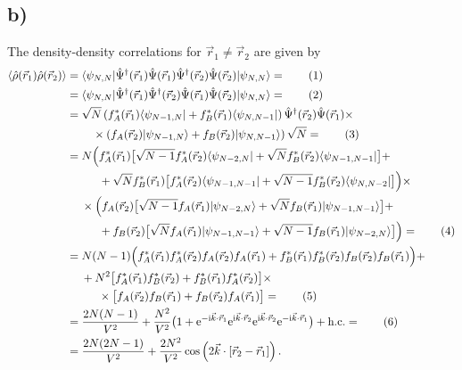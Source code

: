 \documentclass[english, parskip=full]{scrartcl}
\newcommand\numberthis{\addtocounter{equation}{1}\tag{\theequation}}
\newcommand{\bra}{}
\newcommand{\braket}{}
\newcommand{\kla}{}
\newcommand{\tecxt}{}
\newcommand{\Bra}{}
\newcommand{\Ket}{}
\renewcommand{\i}{\text{i}}
\newcommand{\e}{\text{e}}
\begin{document}
\subsection*{b)}
The density-density correlations for $\vec{r}_1 \neq \vec{r}_2$ are given by
\begin{align*}
\bra\langle \hat{\rho}(\vec{r}_1) \hat{\rho}(\vec{r}_2) \rangle &= \braket\langle \psi_{N,N} | \hat{\Psi}^\dagger (\vec{r}_1) \hat{\Psi}(\vec{r}_1) \hat{\Psi}^\dagger (\vec{r}_2) \hat{\Psi}(\vec{r}_2) | \psi_{N,N} \rangle = \numberthis  \\
&= \braket\langle \psi_{N,N} | \hat{\Psi}^\dagger (\vec{r}_1) \hat{\Psi}^\dagger (\vec{r}_2) \hat{\Psi}(\vec{r}_1) \hat{\Psi}(\vec{r}_2) | \psi_{N,N} \rangle = \numberthis \\
&= \sqrt{N}\kla\left( f_A^\ast (\vec{r}_1) \Bra\langle \psi_{N-1,N} | + f_B^\ast (\vec{r}_1) \Bra\langle \psi_{N,N-1} | \right) \hat{\Psi}^\dagger (\vec{r}_2) \hat{\Psi}(\vec{r}_1) \times \\
&\hspace{0.8cm} \times \kla\left( f_A (\vec{r}_2) | \psi_{N-1,N} \rangle  + f_B (\vec{r}_2) | \psi_{N,N-1} \rangle  \right) \sqrt{N} =  \numberthis \\
&= N \Big( f_A^\ast (\vec{r}_1) \big[ \sqrt{N-1} f_A^\ast (\vec{r}_2) \Bra\langle \psi_{N-2,N} | + \sqrt{N} f_B^\ast (\vec{r}_2) \Bra\langle \psi_{N-1,N-1} | \big] + \\
&\hspace{1cm} + \sqrt{N} f_B^\ast (\vec{r}_1) \big[ f_A^\ast (\vec{r}_2) \Bra\langle \psi_{N-1,N-1} | + \sqrt{N-1} f_B^\ast (\vec{r}_2) \Bra\langle \psi_{N,N-2} | \big] \Big) \times \\
&\hspace{0.45cm} \times \Big( f_A (\vec{r}_2) \big[ \sqrt{N-1} f_A (\vec{r}_1) \Ket | \psi_{N-2,N} \rangle + \sqrt{N} f_B (\vec{r}_1) \Ket | \psi_{N-1,N-1} \rangle \big] + \\
&\hspace{1cm} + f_B (\vec{r}_2) \big[ \sqrt{N} f_A (\vec{r}_1) \Ket | \psi_{N-1,N-1} \rangle + \sqrt{N-1} f_B (\vec{r}_1) \Ket | \psi_{N-2,N} \rangle \big]  \Big) = \numberthis  \\
&= N(N-1) \Big( f_A^\ast (\vec{r}_1) f_A^\ast (\vec{r}_2) f_A (\vec{r}_2) f_A (\vec{r}_1) + f_B^\ast (\vec{r}_1) f_B^\ast (\vec{r}_2) f_B (\vec{r}_2) f_B (\vec{r}_1) \Big) + \\
&\hspace{0.45cm} + N^2\big[ f_A^\ast (\vec{r}_1) f_B^\ast (\vec{r}_2) + f_B^\ast (\vec{r}_1) f_A^\ast (\vec{r}_2) \big] \times \\
&\hspace{0.98cm} \times \big[ f_A (\vec{r}_2) f_B (\vec{r}_1) + f_B (\vec{r}_2) f_A (\vec{r}_1) \big] = \numberthis  \\
&= \frac{2N(N-1)}{V^2} + \frac{N^2}{V^2} \big( 1 + \e^{-\i\vec{k}\cdot\vec{r}_1} \e^{\i\vec{k}\cdot\vec{r}_2} \e^{\i\vec{k}\cdot\vec{r}_2} \e^{-\i\vec{k}\cdot\vec{r}_1} \big) + \tecxt\text{h.c.} = \numberthis \\
&= \frac{2N(2N-1)}{V^2} + \frac{2N^2}{V^2}\cos\kla\left( 2\vec{k}\cdot [\vec{r}_2 - \vec{r}_1] \right).
\end{align*}
\end{document}
